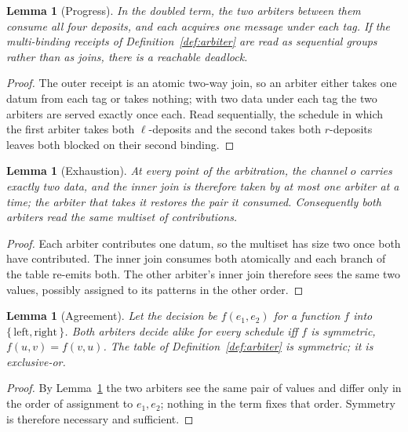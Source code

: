 \documentclass[11pt]{article}
\newtheorem{lemma}[theorem]{Lemma}
\theoremstyle{definition}
\begin{document}
\begin{lemma}[Progress]\label{lem:progress}
In the doubled term, the two arbiters between them consume all four deposits, and each acquires one message under each tag. If the multi-binding receipts of Definition~\ref{def:arbiter} are read as sequential groups rather than as joins, there is a reachable deadlock.
\end{lemma}

\begin{proof}
The outer receipt is an atomic two-way join, so an arbiter either takes one datum from each tag or takes nothing; with two data under each tag the two arbiters are served exactly once each. Read sequentially, the schedule in which the first arbiter takes both $\ell$-deposits and the second takes both $r$-deposits leaves both blocked on their second binding.
\end{proof}

\begin{lemma}[Exhaustion]\label{lem:exh}
At every point of the arbitration, the channel $o$ carries exactly two data, and the inner join is therefore taken by at most one arbiter at a time; the arbiter that takes it restores the pair it consumed. Consequently both arbiters read the same multiset of contributions.
\end{lemma}

\begin{proof}
Each arbiter contributes one datum, so the multiset has size two once both have contributed. The inner join consumes both atomically and each branch of the table re-emits both. The other arbiter's inner join therefore sees the same two values, possibly assigned to its patterns in the other order.
\end{proof}

\begin{lemma}[Agreement]\label{lem:agree}
Let the decision be $f(e_1, e_2)$ for a function $f$ into $\{\,\text{left},\text{right}\,\}$. Both arbiters decide alike for every schedule iff $f$ is symmetric, $f(u,v) = f(v,u)$. The table of Definition~\ref{def:arbiter} is symmetric; it is exclusive-or.
\end{lemma}

\begin{proof}
By Lemma~\ref{lem:exh} the two arbiters see the same pair of values and differ only in the order of assignment to $e_1, e_2$; nothing in the term fixes that order. Symmetry is therefore necessary and sufficient.
\end{proof}
\end{document}
